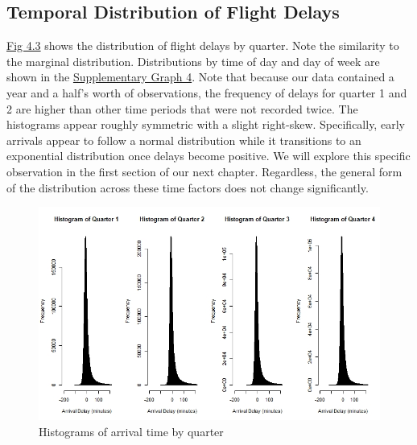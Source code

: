 \documentclass[12pt, a4paper, openany]{book}
\newcommand\tab[1][1cm]{\hspace*{#1}}
\begin{document}
		\subsection{Temporal Distribution of Flight Delays}
		
			\tab \underline{Fig 4.3} shows the distribution of flight delays by quarter. Note the similarity to the marginal distribution. Distributions by time of day and day of week are shown in the \underline{Supplementary Graph 4}. Note that because our data contained a year and a half’s worth of observations, the frequency of delays for quarter 1 and 2 are higher than other time periods that were not recorded twice. The histograms appear roughly symmetric with a slight right-skew. Specifically, early arrivals appear to follow a normal distribution while it transitions to an exponential distribution once delays become positive. We will explore this specific observation in the first section of our next chapter. Regardless, the general form of the distribution across these time factors does not change significantly. \\
		\begin{figure}
		\centering
		\includegraphics[width = .45 \textwidth]{../figures/PLOTS FOR REPORT/Chapter 4/Figure 4.31}
		\caption{ Histograms of arrival time by quarter}
		\end{figure}
	
\end{document}
